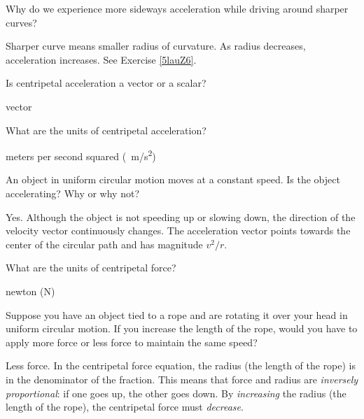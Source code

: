 \documentclass[../main-physics-workbook.tex]{subfiles}
\begin{document}
\begin{questions}
\question \label{KB7t4k} %
Why do we experience more sideways acceleration while driving around sharper curves?

\begin{solution}
Sharper curve means smaller radius of curvature. As radius decreases, acceleration increases. See Exercise \ref{5lauZ6}.
\end{solution}


\question \label{jb3iGO} %
Is centripetal acceleration a vector or a scalar?

\begin{solution}
vector
\end{solution}


\question \label{TUxTQh} %
What are the units of centripetal acceleration?

\begin{solution}
meters per second squared (\SI{}{m/s^2})
\end{solution}





\question \label{IAjJBC} %
An object in uniform circular motion moves at a constant speed. Is the object accelerating? Why or why not?

\begin{solution}
Yes. Although the object is not speeding up or slowing down, the direction of the velocity vector continuously changes. The acceleration vector points towards the center of the circular path and has magnitude $v^2/r$.
\end{solution}






\question \label{9YKhPo} %
What are the units of centripetal force?

\begin{solution}
newton (N)
\end{solution}

\question \label{aVu3ZA} %
Suppose you have an object tied to a rope and are rotating it over your head in uniform circular motion. If you increase the length of the rope, would you have to apply more force or less force to maintain the same speed?

\begin{solution}
Less force. In the centripetal force equation, the radius (the length of the rope) is in the denominator of the fraction. This means that force and radius are \textit{inversely proportional}: if one goes up, the other goes down. By \textit{increasing} the radius (the length of the rope), the centripetal force must \textit{decrease}.
\end{solution}


\end{questions}
\end{document}
